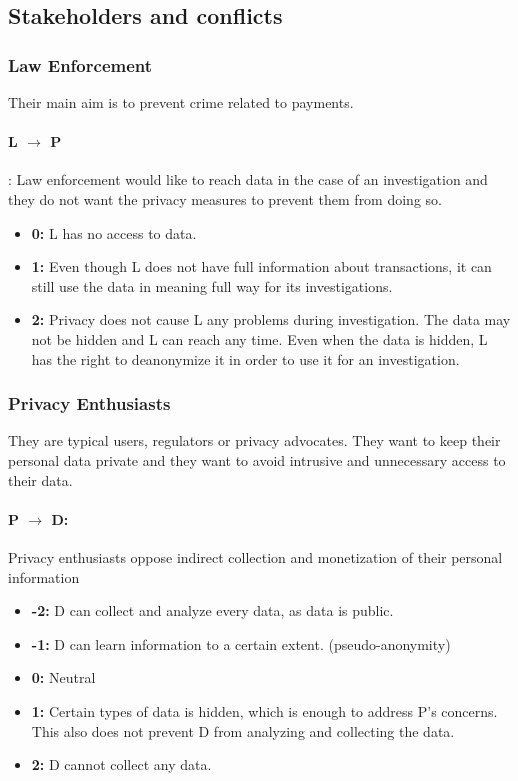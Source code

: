 \documentclass[runningheads]{llncs}
\begin{document}
 \subsection{Stakeholders and conflicts}
 \subsubsection{Law Enforcement}
  Their main aim is to prevent crime related to payments. 
  \paragraph{L $\rightarrow$ P}: Law enforcement would like to reach data in the case of an investigation and they do not want the privacy measures to prevent them from doing so.
  
  \begin{itemize}
  	\item \textbf{0:} L has no access to data. 
  	\item \textbf{1:} Even though L does not have full information about transactions, it can still use the data in meaning full way for its investigations.
  	\item \textbf{2:} Privacy does not cause L any problems during investigation. The data may not be hidden and L can reach any time. Even when the data is hidden, L has the right to deanonymize it in order to use it for an investigation.
  \end{itemize}
  
  
 \subsubsection{Privacy Enthusiasts}
 They are typical users, regulators or privacy advocates. They want to keep their personal data private and they want to avoid intrusive and unnecessary access to their data.
 \paragraph{P $\rightarrow$ D:} Privacy enthusiasts oppose indirect collection and monetization of their personal information
 
   \begin{itemize}
 	\item \textbf{-2:} D can collect and analyze every data, as data is public. 
 	\item \textbf{-1:} D can learn information to a certain extent. (\eg pseudo-anonymity)
 	\item \textbf{0:} Neutral
 	\item \textbf{1:} Certain types of data is hidden, which is enough to address P's concerns. This also does not prevent D from analyzing and collecting the data. 
 	\item \textbf{2:} D cannot collect any data.
 \end{itemize}
\end{document}
